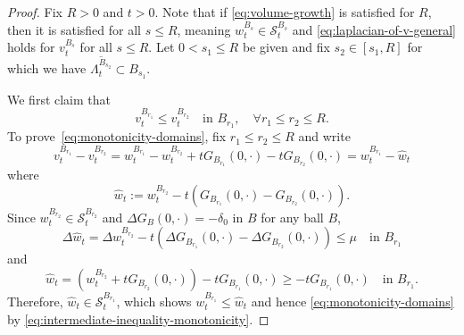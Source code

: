 \documentclass[12pt]{amsart}
\numberwithin{equation}{section}
\newcommand{\mclS}[2]{\hyperref[eq:super-solutions]{\mathcal{S}^{#1}_{#2}}}
\newcommand{\lss}[2]{\hyperref[eq:least-super-solution]{w^{#1}_{#2}}}
\newcommand{\cluster}[2]{\hyperref[eq:non-co-set]{\mathit{\Lambda}^{#1}_{#2}}}
\newcommand{\odometer}[2]{\hyperref[eq:limit-odometer]{v^{#1}_{#2}}}
\begin{document}
	\begin{proof}
		Fix $R > 0$ and $t>0$. Note that if \eqref{eq:volume-growth} is satisfied for $R$, then it is satisfied for all $s \leq R$,
		meaning $\lss{B_s}{t} \in \mclS{B_s}{t}$ and \eqref{eq:laplacian-of-v-general} holds for $\odometer{B_s}{t}$ for all $s \leq R$. Let $0<s_1 \leq R$ be given and fix $s_2 \in [s_1, R]$ for which we have $\overline{\cluster{B_{s_2}}{t}} \subset B_{s_1}$.
		
		We first claim that
		\begin{equation} \label{eq:monotonicity-domains}
		\odometer{B_{r_1}}{t} \leq \odometer{B_{r_2}}{t} \quad \mbox{in $B_{r_1}$}, \quad \forall r_1 \leq r_2 \leq R.
		\end{equation}
		To prove~\eqref{eq:monotonicity-domains}, fix $r_1 \leq r_2 \leq R$ and write
		\begin{equation} \label{eq:intermediate-inequality-monotonicity}
		\odometer{B_{r_1}}{t} - \odometer{B_{r_2}}{t} =  \lss{B_{r_1}}{t} -  \lss{B_{r_2}}{t} + t G_{B_{r_1}}(0,\cdot) - t G_{B_{r_2}}(0,\cdot) = \lss{B_{r_1}}{t} - \hat{w}_t
		\end{equation}
		where
		\begin{equation}
		\hat{w}_t := \lss{B_{r_2}}{t} - t (G_{B_{r_1}}(0,\cdot) - G_{B_{r_2}}(0,\cdot))  .
		\end{equation}
		Since $\lss{B_{r_2}}{t} \in \mclS{B_{r_2}}{t}$ and $\Delta G_{B}(0,\cdot) = -\delta_0$ in $B$ for any ball $B$, 
		\begin{equation}
		\Delta \hat{w}_t = \Delta \lss{B_{r_2}}{t} - t (\Delta G_{B_{r_1}}(0,\cdot) - \Delta G_{B_{r_2}}(0,\cdot)) \leq \mu  \quad \mbox{in $B_{r_1}$}
		\end{equation}
		and 
		\begin{equation}
		\hat{w}_t = (\lss{B_{r_2}}{t}  + t G_{B_{r_2}}(0,\cdot)) - t G_{B_{r_1}}(0,\cdot)  \geq - t G_{B_{r_1}}(0,\cdot) \quad \mbox{in $B_{r_1}$}.
		\end{equation}
		Therefore, $\hat{w}_t \in \mclS{B_{r_1}}{t}$, which shows $\lss{B_{r_1}}{t} \leq \hat{w}_t$ and hence \eqref{eq:monotonicity-domains} by \eqref{eq:intermediate-inequality-monotonicity}.
		

\end{proof}
\end{document}
